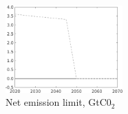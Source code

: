 % 


%			

\begin{figure}
	\caption{Net emission limit, GtC0$_2$}\label{fig:emlimit}
	\includegraphics[width=0.4\textwidth]{../../codding_model/own_basedOnFried/optimalPol_010922_revision/figures/all_13Sept22_Tplus30/Emnet.png}
\end{figure}

